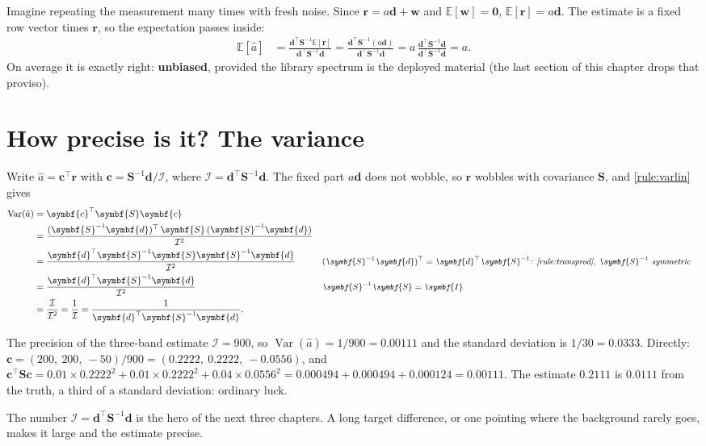 \documentclass[11pt,a4paper,oneside,openany]{book}
\newcommand{\B}[1]{{\symbf{#1}}}
\newcommand{\B}[1]{{\bm{#1}}}
\newcommand{\T}{^{\top}}
\newcommand{\E}{\mathbb{E}}
\newcommand{\Var}{\operatorname{Var}}
\newcommand{\vr}{\B{r}}
\newcommand{\vd}{\B{d}}
\newcommand{\vw}{\B{w}}
\newcommand{\vc}{\B{c}}
\newcommand{\mS}{\B{S}}
\newcommand{\mI}{\B{I}}
\newcommand{\ahat}{\hat a}
\newcommand{\why}[1]{&&\text{\small\itshape #1}}
\begin{document}
Imagine repeating the measurement many times with fresh noise. Since $\vr=a\vd+\vw$ and $\E[\vw]=\B0$, $\E[\vr]=a\vd$. The estimate is a
fixed row vector times $\vr$, so the expectation passes inside:
\begin{align*}
\E[\ahat] &= \frac{\vd\T\mS^{-1}\E[\vr]}{\vd\T\mS^{-1}\vd}=\frac{\vd\T\mS^{-1}(a\vd)}{\vd\T\mS^{-1}\vd}=a\,\frac{\vd\T\mS^{-1}\vd}{\vd\T\mS^{-1}\vd}=a .
\end{align*}
On average it is exactly right: \textbf{unbiased}, provided the library spectrum is the deployed material (the last section of this
chapter drops that proviso).

\section{How precise is it? The variance}

Write $\ahat=\vc\T\vr$ with $\vc=\mS^{-1}\vd/\mathcal I$, where $\mathcal I=\vd\T\mS^{-1}\vd$. The fixed part $a\vd$ does not wobble, so
$\vr$ wobbles with covariance $\mS$, and \cref{rule:varlin} gives
\begin{align*}
\Var(\ahat) &= \vc\T\mS\vc\\
 &= \frac{(\mS^{-1}\vd)\T\,\mS\,(\mS^{-1}\vd)}{\mathcal I^2}\\
 &= \frac{\vd\T\mS^{-1}\mS\mS^{-1}\vd}{\mathcal I^2} \why{$(\mS^{-1}\vd)\T=\vd\T\mS^{-1}$: \cref{rule:transprod}, $\mS^{-1}$ symmetric}\\
 &= \frac{\vd\T\mS^{-1}\vd}{\mathcal I^2} \why{$\mS^{-1}\mS=\mI$}\\
 &= \frac{\mathcal I}{\mathcal I^2}=\frac1{\mathcal I}=\frac{1}{\vd\T\mS^{-1}\vd} .
\end{align*}

\begin{worked}[label=we:fillvar]{The precision of the three-band estimate}
$\mathcal I=900$, so $\Var(\ahat)=1/900=0.00111$ and the standard deviation is $1/30=0.0333$. Directly: $\vc=(200,\ 200,\ -50)/900=(0.2222,\
0.2222,\ -0.0556)$, and $\vc\T\mS\vc=0.01\times0.2222^2+0.01\times0.2222^2+0.04\times0.0556^2=0.000494+0.000494+0.000124=0.00111$.
The estimate $0.2111$ is $0.0111$ from the truth, a third of a standard deviation: ordinary luck.
\end{worked}

The number $\mathcal I=\vd\T\mS^{-1}\vd$ is the hero of the next three chapters. A long target difference, or one pointing where the
background rarely goes, makes it large and the estimate precise.
\end{document}
